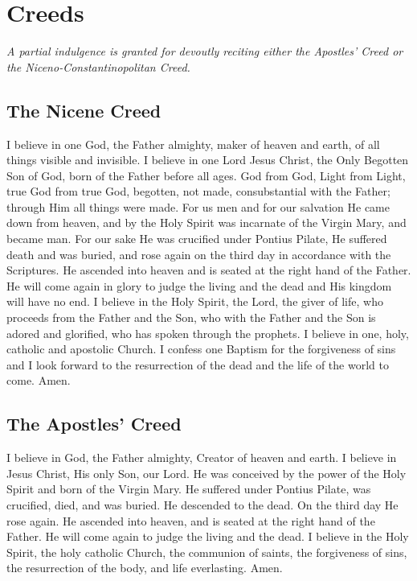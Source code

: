 \documentclass[12pt]{article}
\newcommand{\prayersection}[1]{\section{#1}}
\newcommand{\prayertitle}[1]{\subsection{#1}}
\newcommand{\indulgencedprayertitle}[1]{\prayertitle{#1 \protect\kreuz}}
\newcommand{\note}[1]{{\small{\textsl{#1}}}\newline}
\begin{document}
\newpage

\prayersection{Creeds}
\note{A partial indulgence is granted for devoutly reciting either the Apostles' Creed or the Niceno-Constantinopolitan Creed.}
\indulgencedprayertitle{The Nicene Creed}
I believe in one God, the Father almighty, maker of heaven and earth, of all things visible and invisible.
I believe in one Lord Jesus Christ, the Only Begotten Son of God, born of the Father before all ages.
God from God, Light from Light, true God from true God, begotten, not made, consubstantial with the Father;
through Him all things were made.
For us men and for our salvation He came down from heaven, and by the Holy Spirit was incarnate of the Virgin Mary, and became man.
For our sake He was crucified under Pontius Pilate, He suffered death and was buried, and rose again on the third day in accordance with the Scriptures.
He ascended into heaven and is seated at the right hand of the Father.
He will come again in glory to judge the living and the dead and His kingdom will have no end.
I believe in the Holy Spirit, the Lord, the giver of life, who proceeds from the Father and the Son, who with the Father and the Son is adored and glorified, who has spoken through the prophets.
I believe in one, holy, catholic and apostolic Church.
I confess one Baptism for the forgiveness of sins and I look forward to the resurrection of the dead and the life of the world to come.
Amen.

\indulgencedprayertitle{The Apostles' Creed}
I believe in God, the Father almighty, Creator of heaven and earth.
I believe in Jesus Christ, His only Son, our Lord.
He was conceived by the power of the Holy Spirit and born of the Virgin Mary.
He suffered under Pontius Pilate, was crucified, died, and was buried.
He descended to the dead.
On the third day He rose again.
He ascended into heaven, and is seated at the right hand of the Father.
He will come again to judge the living and the dead.
I believe in the Holy Spirit, the holy catholic Church, the communion of saints, the forgiveness of sins, the resurrection of the body, and life everlasting.
Amen.

\newpage
\end{document}
